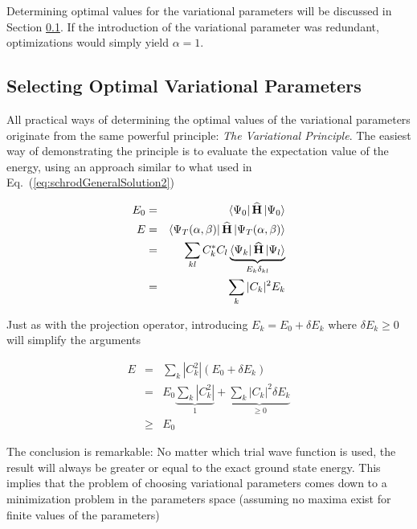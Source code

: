 
Determining optimal values for the variational parameters will be discussed in Section \ref{sec:selectingOptVarPar}. If the introduction of the variational parameter was redundant, optimizations would simply yield $\alpha=1$. 


\subsection{Selecting Optimal Variational Parameters}
\label{sec:selectingOptVarPar}

All practical ways of determining the optimal values of the variational parameters originate from the same powerful principle: \textit{The Variational Principle}. The easiest way of demonstrating the principle is to evaluate the expectation value of the energy, using an approach similar to what used in Eq.~(\ref{eq:schrodGeneralSolution2})

\begin{eqnarray*}
 E_0 &=& \left< \Psi_0 \right|{\bf\widehat{H}}\left| \Psi_0 \right>  \\
 E   &=& \left< \Psi_T(\alpha, \beta) \right|{\bf\widehat{H}}\left| \Psi_T(\alpha, \beta) \right>\\
     &=& \sum_{kl} C_k^\ast C_l \underbrace{\left< \Psi_k \right|{\bf\widehat{H}}\left| \Psi_l \right>}_{E_k\delta_{kl}} \\
     &=& \sum_k |C_k|^2E_k
\end{eqnarray*}

Just as with the projection operator, introducing $E_k = E_0 + \delta E_k$ where $\delta E_k \ge 0$ will simplify the arguments

\begin{eqnarray*}
 E   &=& \sum_k |C_k^2| (E_0 + \delta E_k) \\
     &=& E_0 \underbrace{\sum_k |C_k^2|}_{1} + \underbrace{\sum_k |C_k|^2\delta E_k}_{\ge 0} \\
     &\ge& E_0
\end{eqnarray*}

The conclusion is remarkable: No matter which trial wave function is used, the result will always be greater or equal to the exact ground state energy. This implies that the problem of choosing variational parameters comes down to a minimization problem in the parameters space (assuming no maxima exist for finite values of the parameters)


